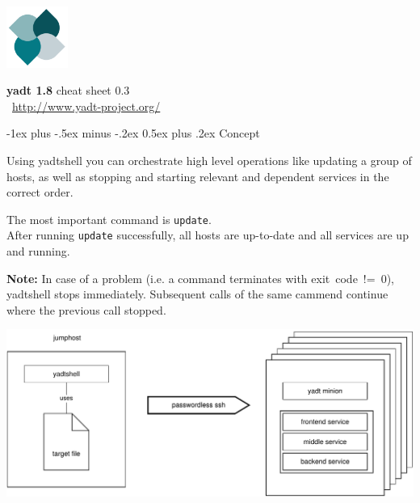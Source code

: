 \documentclass[10pt,landscape]{article}
\makeatletter
\renewcommand{\section}{\@startsection{section}{1}{0mm}%
                                {-1ex plus -.5ex minus -.2ex}%
                                {0.5ex plus .2ex}%
                                {\normalfont\large\bfseries}}
\newcommand{\note}[1]{\medskip\textbf{Note:} {#1}\medskip}
\makeatother
\begin{document}
\raggedright
\footnotesize
\begin{multicols}{3}
\raggedcolumns


\setlength{\premulticols}{1pt}
\setlength{\postmulticols}{1pt}
\setlength{\multicolsep}{1em}
\setlength{\columnsep}{1em}

\includegraphics[width=2cm,valign=t]{res/yadtlogo}%
\hfill%
\begin{minipage}[t]{5cm}
{\Large{\textbf{yadt 1.8}}}\hfill
\textcolor{faded}{cheat sheet 0.3}\\[1em]
~\hfill\href{http://www.yadt-project.org/}{http://www.yadt-project.org/}
\end{minipage}


\section{Concept}

Using yadtshell you can orchestrate high level operations like updating
a group of hosts, as well as stopping and starting relevant and dependent
services in the correct order.
\medskip

The most important command is \verb+update+.\\
After running \verb+update+ successfully, all hosts are up-to-date and
all services are up and running.

\note{In case of a problem (i.e. a command terminates with exit~code~!=~0),
yadtshell stops immediately. Subsequent calls of the same cammend continue
where the previous call stopped.}

\includegraphics[width=\linewidth]{res/concept}


\end{multicols}
\end{document}
